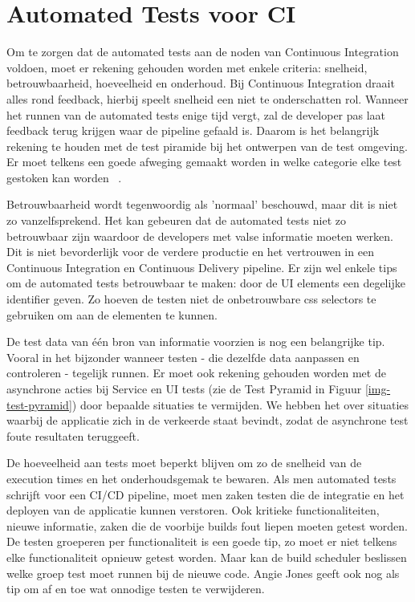 \section{Automated Tests voor CI}
\label{sec:automated-test-voor-ci}
Om te zorgen dat de automated tests aan de noden van Continuous Integration voldoen, moet er rekening gehouden worden met enkele criteria: snelheid, betrouwbaarheid, hoeveelheid en onderhoud.
Bij Continuous Integration draait alles rond feedback, hierbij speelt snelheid een niet te onderschatten rol. Wanneer het runnen van de automated tests enige tijd vergt, zal de developer pas laat feedback terug krijgen waar de pipeline gefaald is. Daarom is het belangrijk rekening te houden met de test piramide bij het ontwerpen van de test omgeving. Er moet telkens een goede afweging gemaakt worden in welke categorie elke test gestoken kan worden ~\autocite{Jones2019}.

Betrouwbaarheid wordt tegenwoordig als 'normaal' beschouwd, maar dit is niet zo vanzelfsprekend. Het kan gebeuren dat de automated tests niet zo betrouwbaar zijn waardoor de developers met valse informatie moeten werken. Dit is niet bevorderlijk voor de verdere productie en het vertrouwen in een Continuous Integration en Continuous Delivery pipeline. Er zijn wel enkele tips om de automated tests betrouwbaar te maken: door de UI elements een degelijke identifier geven. Zo hoeven de testen niet de onbetrouwbare css selectors te gebruiken om aan de elementen te kunnen. 

De test data van één bron van informatie voorzien is nog een belangrijke tip. Vooral in het bijzonder wanneer testen - die dezelfde data aanpassen en controleren - tegelijk runnen. Er moet ook rekening gehouden worden met de asynchrone acties bij Service en UI tests (zie de Test Pyramid in Figuur \ref{img-test-pyramid}) door bepaalde situaties te vermijden. We hebben het over situaties waarbij de applicatie zich in de verkeerde staat bevindt, zodat de asynchrone test foute resultaten teruggeeft.

De hoeveelheid aan tests moet beperkt blijven om zo de snelheid van de execution times en het onderhoudsgemak te bewaren.
Als men automated tests schrijft voor een CI/CD pipeline, moet men zaken testen die de integratie en het deployen van de applicatie kunnen verstoren.
Ook kritieke functionaliteiten, nieuwe informatie, zaken die de voorbije builds fout liepen moeten getest worden. 
De testen groeperen per functionaliteit is een goede tip, zo moet er niet telkens elke functionaliteit opnieuw getest worden. Maar kan de build scheduler beslissen welke groep test moet runnen bij de nieuwe code. 
Angie Jones \textcite{Jones2019} geeft ook nog als tip om af en toe wat onnodige testen te verwijderen.

